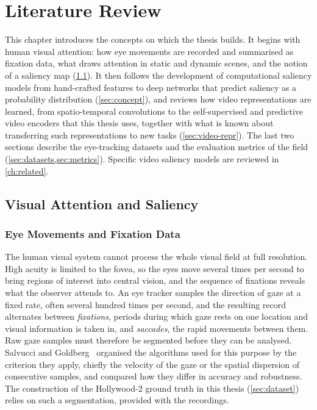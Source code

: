 \chapter{Literature Review}\label{ch:literature}


This chapter introduces the concepts on which the thesis builds. It begins with
human visual attention: how eye movements are recorded and summarised as
fixation data, what draws attention in static and dynamic scenes, and the notion
of a saliency map (\cref{sec:overview}). It then follows the development of
computational saliency models from hand-crafted features to deep networks that
predict saliency as a probability distribution (\cref{sec:concept}), and reviews
how video representations are learned, from spatio-temporal convolutions to the
self-supervised and predictive video encoders that this thesis uses, together
with what is known about transferring such representations to new tasks
(\cref{sec:video-repr}). The last two sections describe the eye-tracking
datasets and the evaluation metrics of the field (\cref{sec:datasets,sec:metrics}).
Specific video saliency models are reviewed in \cref{ch:related}.

\section{Visual Attention and Saliency}\label{sec:overview}

\subsection{Eye Movements and Fixation Data}\label{sec:eye-movements}

The human visual system cannot process the whole visual field at full
resolution. High acuity is limited to the fovea, so the eyes move several times
per second to bring regions of interest into central vision, and the sequence of
fixations reveals what the observer attends to. An eye tracker samples the
direction of gaze at a fixed rate, often several hundred times per second, and
the resulting record alternates between \emph{fixations}, periods during which
gaze rests on one location and visual information is taken in, and
\emph{saccades}, the rapid movements between them. Raw gaze samples must
therefore be segmented before they can be analysed. Salvucci and
Goldberg~\cite{salvucci2000identifying} organised the algorithms used for this
purpose by the criterion they apply, chiefly the velocity of the gaze or the
spatial dispersion of consecutive samples, and compared how they differ in
accuracy and robustness. The construction of the
Hollywood-2 ground truth in this thesis (\cref{sec:dataset}) relies on such a
segmentation, provided with the recordings.

